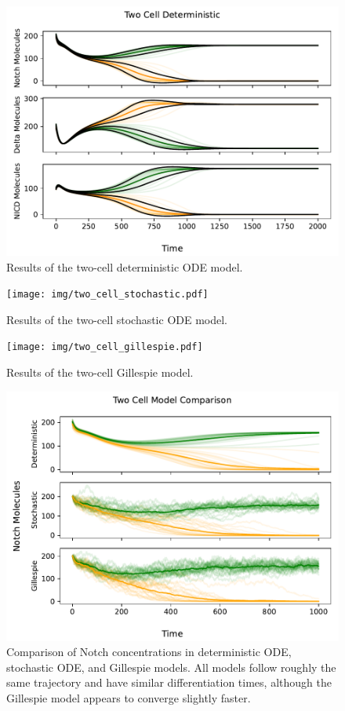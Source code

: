 \documentclass{article}
\begin{document}
\begin{flushleft}
\begin{figure}
  \includegraphics[width=\textwidth]{img/two_cell_deterministic.pdf}
  \caption{Results of the two-cell deterministic ODE model.}
\end{figure}

\begin{figure}
  \texttt{[image: img/two\_cell\_stochastic.pdf]}
  \caption{Results of the two-cell stochastic ODE model.}
\end{figure}

\begin{figure}
  \texttt{[image: img/two\_cell\_gillespie.pdf]}
  \caption{Results of the two-cell Gillespie model.}
\end{figure}

\begin{figure}
  \includegraphics[width=\textwidth]{img/two_cell_comparison.pdf}
  \caption{Comparison of Notch concentrations in deterministic ODE, stochastic ODE, and Gillespie models. All models follow roughly the same trajectory and have similar differentiation times, although the Gillespie model appears to converge slightly faster.}
\end{figure}


\end{flushleft}
\end{document}
